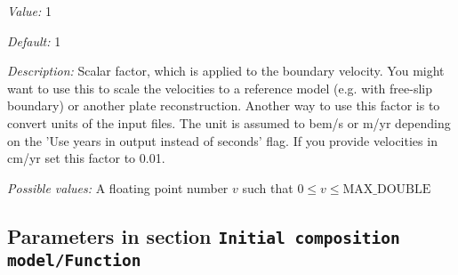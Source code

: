 \begin{itemize}
{\it Value:} 1


{\it Default:} 1


{\it Description:} Scalar factor, which is applied to the boundary velocity. You might want to use this to scale the velocities to a reference model (e.g. with free-slip boundary) or another plate reconstruction. Another way to use this factor is to convert units of the input files. The unit is assumed to bem/s or m/yr depending on the 'Use years in output instead of seconds' flag. If you provide velocities in cm/yr set this factor to 0.01.


{\it Possible values:} A floating point number $v$ such that $0 \leq v \leq \text{MAX\_DOUBLE}$
\end{itemize}

\subsection{Parameters in section \tt Initial composition model/Function}
\label{parameters:Initial_20composition_20model/Function}

